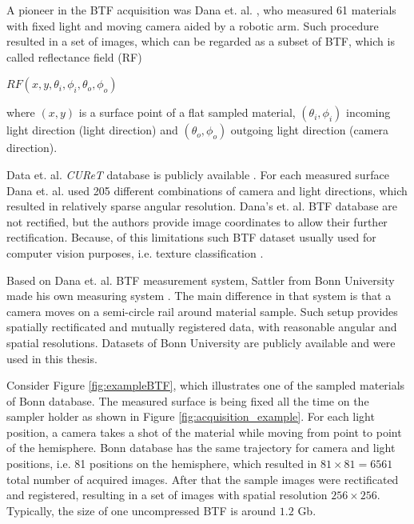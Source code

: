  
A pioneer in the BTF acquisition was Dana et. al. \cite{curetDataBase}, who measured 61 materials with fixed light and moving camera aided by a robotic arm. 
Such procedure resulted in a set of images, which can be regarded as a subset of BTF, which is called reflectance field (RF)

{\centering $RF(x,y,\theta _{i},\phi _{i},\theta _{o},\phi _{o})$ \\}

where $(x,y)$ is a surface point of a flat sampled material, $(\theta _{i},\phi _{i})$ incoming light direction (light direction) and $(\theta _{o},\phi _{o})$ outgoing light direction (camera direction).

Data et. al. \emph{CUReT} database is publicly available \cite{curetDataBase}.
For each measured surface Dana et. al. used 205 different combinations of camera and light directions, which resulted in relatively sparse angular resolution.
 Dana's et. al. BTF database are not rectified, but  the authors provide image coordinates to allow their further rectification. 
 Because, of this limitations such BTF dataset usually used for computer vision purposes, i.e. texture classification  \cite{haindl_visual}.

Based on Dana et. al. BTF measurement system, Sattler from Bonn University made his own measuring system \cite{sattler-2003-efficient}.
 The main difference in that system is that a camera moves on a semi-circle rail around material sample.
Such setup provides spatially rectificated and mutually registered data, with reasonable angular and spatial resolutions. 
Datasets of Bonn University \cite{btfBonn} are publicly available and were used in this thesis.


 Consider Figure \ref{fig:exampleBTF}, which illustrates one of the sampled materials of Bonn database.
The measured surface is being fixed all the time on the sampler holder as shown in Figure \ref{fig:acquisition_example}. For each light position, a camera takes a shot of the material while moving from point to point of the hemisphere.
Bonn database has the same trajectory for camera and light positions, i.e. 81 positions on the hemisphere, which resulted in $81\times81=6561$ total number of acquired images.
After that the sample images were rectificated and registered, resulting in a set of images with spatial resolution $256\times256$.
Typically, the size of one uncompressed BTF is around $1.2$ Gb.





